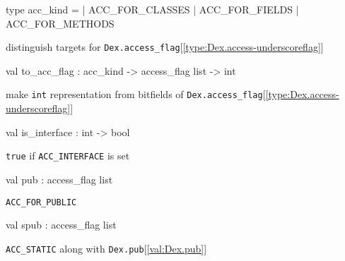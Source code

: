 \documentclass[11pt]{article}
\begin{document}
\label{type:Dex.acc-underscorekind}\begin{ocamldoccode}
type acc_kind =
  | ACC_FOR_CLASSES
  | ACC_FOR_FIELDS
  | ACC_FOR_METHODS
\end{ocamldoccode}
\begin{ocamldocdescription}
distinguish targets for {\tt{Dex.access\_flag}}[\ref{type:Dex.access-underscoreflag}]


\end{ocamldocdescription}




\label{val:Dex.to-underscoreacc-underscoreflag}\begin{ocamldoccode}
val to_acc_flag : acc_kind -> access_flag list -> int
\end{ocamldoccode}
\begin{ocamldocdescription}
make {\tt{int}} representation from bitfields of {\tt{Dex.access\_flag}}[\ref{type:Dex.access-underscoreflag}]


\end{ocamldocdescription}




\label{val:Dex.is-underscoreinterface}\begin{ocamldoccode}
val is_interface : int -> bool
\end{ocamldoccode}
\begin{ocamldocdescription}
{\tt{true}} if {\tt{ACC\_INTERFACE}} is set


\end{ocamldocdescription}




\label{val:Dex.pub}\begin{ocamldoccode}
val pub : access_flag list
\end{ocamldoccode}
\begin{ocamldocdescription}
{\tt{ACC\_FOR\_PUBLIC}}


\end{ocamldocdescription}




\label{val:Dex.spub}\begin{ocamldoccode}
val spub : access_flag list
\end{ocamldoccode}
\begin{ocamldocdescription}
{\tt{ACC\_STATIC}} along with {\tt{Dex.pub}}[\ref{val:Dex.pub}]


\end{ocamldocdescription}
\end{document}
